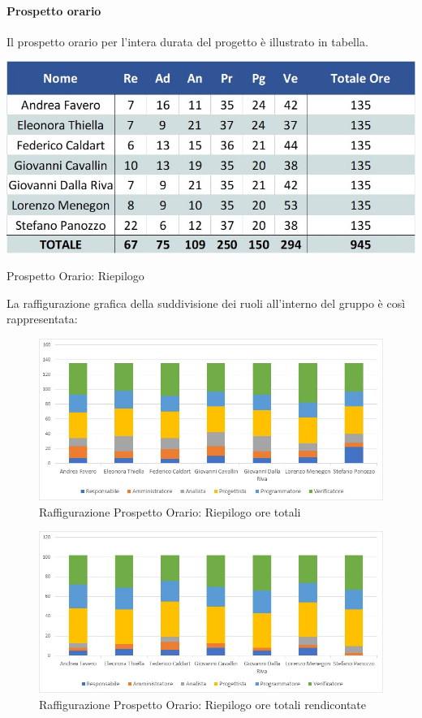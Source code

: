 \paragraph{Prospetto orario}
Il prospetto orario per l'intera durata del progetto è illustrato in tabella. 
\begin{table}[H]
	\centerline{\includegraphics[scale=0.7]{img/Preventivo/TotaleOre.jpg}}
	\caption{Prospetto Orario: Riepilogo}
	\clearpage
\end{table}
La raffigurazione grafica della suddivisione dei ruoli all'interno del gruppo è così rappresentata: 
\begin{figure}[H]
	\centerline{\includegraphics[scale=0.85]{img/Preventivo/Istogrammi/Totale.jpg}}
	\caption{Raffigurazione Prospetto Orario: Riepilogo ore totali}
	\clearpage
\end{figure}
\begin{figure}[H]
	\centerline{\includegraphics[scale=0.85]{img/Preventivo/Istogrammi/TotaleRendicontato.jpg}}
	\caption{Raffigurazione Prospetto Orario: Riepilogo ore totali rendicontate}
	\clearpage
\end{figure}
